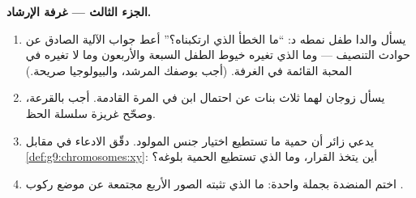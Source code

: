 \begin{problem}
\medskip\noindent\textbf{الجزء الثالث --- غرفة
الإرشاد.}
\begin{enumerate}[resume]
  \item يسأل والدا طفل نمطه  د: ``ما الخطأ الذي
        ارتكبناه؟'' أعط جواب الآلية الصادق عن حوادث
        التنصيف --- وما الذي تغيره خيوط الطفل السبعة
        والأربعون وما لا تغيره في المحبة القائمة في
        الغرفة. (أجب بوصفك المرشد، والبيولوجيا صريحة.)
  \item يسأل زوجان لهما ثلاث بنات عن احتمال ابن في
        المرة القادمة. أجب بالقرعة، وصحّح غريزة سلسلة
        الحظ.
  \item يدعي زائر أن حمية ما تستطيع اختيار جنس المولود.
        دقّق الادعاء في مقابل
        \cref{def:g9:chromosomes:xy}: أين يتخذ القرار،
        وما الذي تستطيع الحمية بلوغه؟
  \item اختم المنضدة بجملة واحدة: ما الذي تثبته الصور
        الأربع مجتمعة عن موضع ركوب .
\end{enumerate}
\end{problem}
